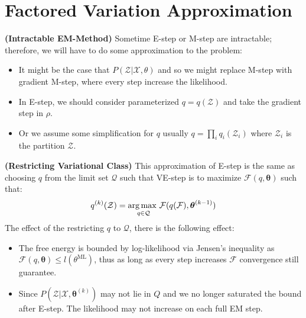 \section{Factored Variation Approximation}

\begin{remark}{\textbf{(Intractable EM-Method)}}
    Sometime E-step or M-step are intractable; therefore, we will have to do some approximation to the problem:
    \begin{itemize}
        \item It might be the case that $P(\mathcal{Z} | \mathcal{X}, \theta)$ and so we might replace M-step with gradient M-step, where every step increase the likelihood.
        \item In E-step, we should consider parameterized $q = q(\mathcal{Z})$ and take the gradient step in $\rho$. 
        \item Or we assume some simplification for $q$ usually $q = \prod_iq_i(\mathcal{Z}_i)$ where $\mathcal{Z}_i$ is the partition $\mathcal{Z}$.
    \end{itemize}
\end{remark}

\begin{remark}{\textbf{(Restricting Variational Class)}}
    This approximation of E-step is the same as choosing $q$ from the limit set $\mathcal{Q}$ such that VE-step is to maximize $\mathcal{F}(q, \boldsymbol \theta)$ such that:
    \begin{equation*}
        q^{(k)}(\mathcal{Z}) = \underset{q\in\mathcal{Q}}{\arg\max \ }\mathcal{F}(q(\mathcal{F}), \boldsymbol \theta^{(k-1)})
    \end{equation*}
    The effect of the restricting $q$ to $\mathcal{Q}$, there is the following effect:
    \begin{itemize}
        \item The free energy is bounded by log-likelihood via Jensen's inequality as $\mathcal{F}(q, \boldsymbol \theta) \le l(\theta^\text{ML})$, thus as long as every step increases $\mathcal{F}$ convergence still guarantee. 
        \item Since $P(\mathcal{Z} | \mathcal{X}, \boldsymbol \theta^{(k)})$ may not lie in $Q$ and we no longer saturated the bound after E-step. The likelihood may not increase on each full EM step. 
    \end{itemize}
\end{remark}


